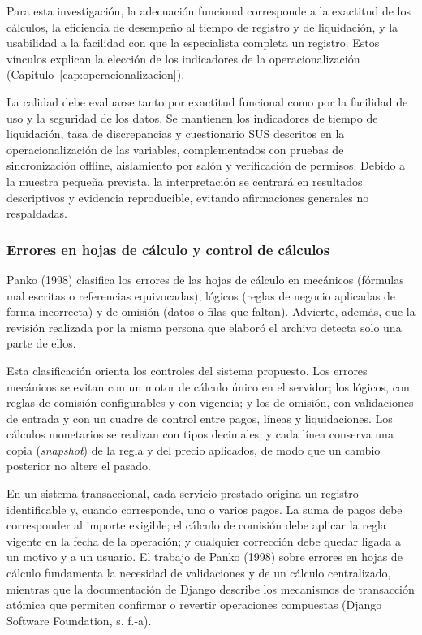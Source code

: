 Para esta investigación, la adecuación funcional corresponde a la exactitud de los cálculos, la eficiencia de desempeño al tiempo de registro y de liquidación, y la usabilidad a la facilidad con que la especialista completa un registro. Estos vínculos explican la elección de los indicadores de la operacionalización (Capítulo~\ref{cap:operacionalizacion}).


La calidad debe evaluarse tanto por exactitud funcional como por la facilidad de uso y la seguridad de los datos. Se mantienen los indicadores de tiempo de liquidación, tasa de discrepancias y cuestionario SUS descritos en la operacionalización de las variables, complementados con pruebas de sincronización offline, aislamiento por salón y verificación de permisos. Debido a la muestra pequeña prevista, la interpretación se centrará en resultados descriptivos y evidencia reproducible, evitando afirmaciones generales no respaldadas.

\subsubsection{Errores en hojas de cálculo y control de cálculos}

Panko (1998) clasifica los errores de las hojas de cálculo en mecánicos (fórmulas mal escritas o referencias equivocadas), lógicos (reglas de negocio aplicadas de forma incorrecta) y de omisión (datos o filas que faltan). Advierte, además, que la revisión realizada por la misma persona que elaboró el archivo detecta solo una parte de ellos.


Esta clasificación orienta los controles del sistema propuesto. Los errores mecánicos se evitan con un motor de cálculo único en el servidor; los lógicos, con reglas de comisión configurables y con vigencia; y los de omisión, con validaciones de entrada y con un cuadre de control entre pagos, líneas y liquidaciones. Los cálculos monetarios se realizan con tipos decimales, y cada línea conserva una copia (\textit{snapshot}) de la regla y del precio aplicados, de modo que un cambio posterior no altere el pasado.


En un sistema transaccional, cada servicio prestado origina un registro identificable y, cuando corresponde, uno o varios pagos. La suma de pagos debe corresponder al importe exigible; el cálculo de comisión debe aplicar la regla vigente en la fecha de la operación; y cualquier corrección debe quedar ligada a un motivo y a un usuario. El trabajo de Panko (1998) sobre errores en hojas de cálculo fundamenta la necesidad de validaciones y de un cálculo centralizado, mientras que la documentación de Django describe los mecanismos de transacción atómica que permiten confirmar o revertir operaciones compuestas (Django Software Foundation, s. f.-a).

